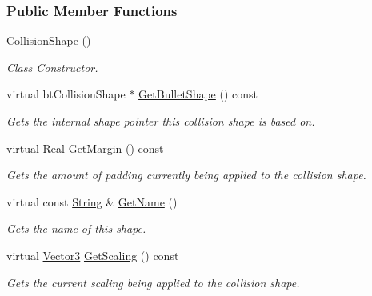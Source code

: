 \subsubsection*{Public Member Functions}
\begin{DoxyCompactItemize}
\item 
\hypertarget{classphys_1_1CollisionShape_ae3adccb28c14fe783c6e5aea98bd1d8b}{
\hyperlink{classphys_1_1CollisionShape_ae3adccb28c14fe783c6e5aea98bd1d8b}{CollisionShape} ()}
\label{classphys_1_1CollisionShape_ae3adccb28c14fe783c6e5aea98bd1d8b}

\begin{DoxyCompactList}\small\item\em Class Constructor. \item\end{DoxyCompactList}\item 
virtual btCollisionShape $\ast$ \hyperlink{classphys_1_1CollisionShape_af6b87471a9fdd99db835e87d6dcfbc8c}{GetBulletShape} () const 
\begin{DoxyCompactList}\small\item\em Gets the internal shape pointer this collision shape is based on. \item\end{DoxyCompactList}\item 
virtual \hyperlink{namespacephys_af7eb897198d265b8e868f45240230d5f}{Real} \hyperlink{classphys_1_1CollisionShape_afd20a29c5deaf6597b41b4edd40c5928}{GetMargin} () const 
\begin{DoxyCompactList}\small\item\em Gets the amount of padding currently being applied to the collision shape. \item\end{DoxyCompactList}\item 
virtual const \hyperlink{namespacephys_aa03900411993de7fbfec4789bc1d392e}{String} \& \hyperlink{classphys_1_1CollisionShape_a505c272e26189586b745195ec1e90c24}{GetName} ()
\begin{DoxyCompactList}\small\item\em Gets the name of this shape. \item\end{DoxyCompactList}\item 
virtual \hyperlink{classphys_1_1Vector3}{Vector3} \hyperlink{classphys_1_1CollisionShape_a95c266959a62b7946256aee1eec7244f}{GetScaling} () const 
\begin{DoxyCompactList}\small\item\em Gets the current scaling being applied to the collision shape. \item\end{DoxyCompactList}\item 

\end{DoxyCompactItemize}
